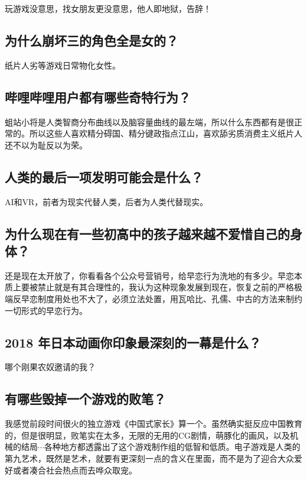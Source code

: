 \documentclass{ctexart}
\begin{document}
	玩游戏没意思，找女朋友更没意思，他人即地狱，告辞！
	
	\subsection{为什么崩坏三的角色全是女的？}
	
	纸片人劣等游戏日常物化女性。
	
	\subsection{哔哩哔哩用户都有哪些奇特行为？}
	
	蛆站小将是人类智商分布曲线以及脑容量曲线的最左端，所以什么东西都有是很正常的。所以这些人喜欢精分碍国、精分键政指点江山，喜欢舔劣质消费主义纸片人还不以为耻反以为荣。
	
	\subsection{人类的最后一项发明可能会是什么？}
	
	AI和VR，前者为现实代替人类，后者为人类代替现实。
	
	\subsection{为什么现在有一些初高中的孩子越来越不爱惜自己的身体？}
	
	还是现在太开放了，你看看各个公众号营销号，给早恋行为洗地的有多少。早恋本质上要被禁止就是有其合理性的，我认为这种现象发展到现在，恢复之前的严格极端反早恋制度用处也不大了，必须立法处置，用瓦哈比、孔儒、中古的方法来制约一切形式的早恋行为。
	
	\subsection{2018 年日本动画你印象最深刻的一幕是什么？}
	
	哪个刚果农奴邀请的我？
	
	\subsection{有哪些毁掉一个游戏的败笔？}
	
	我感觉前段时间很火的独立游戏《中国式家长》算一个。虽然确实挺反应中国教育的，但是很明显，败笔实在太多，无限的无用的CG剧情，萌豚化的画风，以及机械的结局$\cdots$各种地方都透露出了这个游戏制作组的低智和低质。电子游戏是人类的第九艺术，既然是艺术，就要有更深刻一点的含义在里面，而不是为了迎合大众爱好或者凑合社会热点而去哗众取宠。
	
\end{document}
